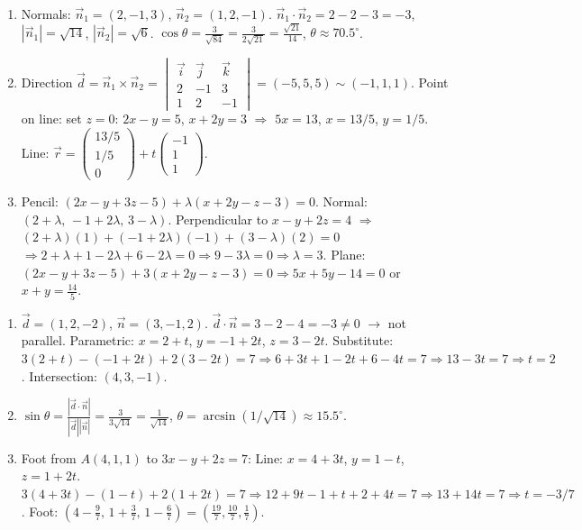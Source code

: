 \documentclass[11pt]{article}
\begin{document}
\begin{corrige}
\begin{enumerate}
\item Normals: $\vec{n}_1=(2,-1,3)$, $\vec{n}_2=(1,2,-1)$.
$\vec{n}_1\cdot\vec{n}_2=2-2-3=-3$, $|\vec{n}_1|=\sqrt{14}$, $|\vec{n}_2|=\sqrt{6}$.
$\cos\theta=\frac{3}{\sqrt{84}}=\frac{3}{2\sqrt{21}}=\frac{\sqrt{21}}{14}$, $\theta\approx 70.5^\circ$.
\item Direction $\vec{d}=\vec{n}_1\times\vec{n}_2=\begin{vmatrix}\vec{i}&\vec{j}&\vec{k}\\2&-1&3\\1&2&-1\end{vmatrix}=(-5,5,5)\sim(-1,1,1)$.
Point on line: set $z=0$: $2x-y=5$, $x+2y=3$ $\Rightarrow$ $5x=13$, $x=13/5$, $y=1/5$.
Line: $\vec{r}=\begin{pmatrix}13/5\\1/5\\0\end{pmatrix}+t\begin{pmatrix}-1\\1\\1\end{pmatrix}$.
\item Pencil: $(2x-y+3z-5)+\lambda(x+2y-z-3)=0$.
Normal: $(2+\lambda,\,-1+2\lambda,\,3-\lambda)$.
Perpendicular to $x-y+2z=4$ $\Rightarrow$ $(2+\lambda)(1)+(-1+2\lambda)(-1)+(3-\lambda)(2)=0$
$\Rightarrow 2+\lambda+1-2\lambda+6-2\lambda=0 \Rightarrow 9-3\lambda=0 \Rightarrow \lambda=3$.
Plane: $(2x-y+3z-5)+3(x+2y-z-3)=0 \Rightarrow 5x+5y-14=0$ or $\boxed{x+y=\frac{14}{5}}$.
\end{enumerate}
\end{corrige}

\begin{corrige}
\begin{enumerate}
\item $\vec{d}=(1,2,-2)$, $\vec{n}=(3,-1,2)$. $\vec{d}\cdot\vec{n}=3-2-4=-3\neq0$ $\rightarrow$ not parallel.
Parametric: $x=2+t$, $y=-1+2t$, $z=3-2t$.
Substitute: $3(2+t)-(-1+2t)+2(3-2t)=7 \Rightarrow 6+3t+1-2t+6-4t=7 \Rightarrow 13-3t=7 \Rightarrow t=2$.
Intersection: $(4,3,-1)$.
\item $\sin\theta=\frac{|\vec{d}\cdot\vec{n}|}{|\vec{d}||\vec{n}|}=\frac{3}{3\sqrt{14}}=\frac{1}{\sqrt{14}}$, $\theta=\arcsin(1/\sqrt{14})\approx 15.5^\circ$.
\item Foot from $A(4,1,1)$ to $3x-y+2z=7$:
Line: $x=4+3t$, $y=1-t$, $z=1+2t$.
$3(4+3t)-(1-t)+2(1+2t)=7 \Rightarrow 12+9t-1+t+2+4t=7 \Rightarrow 13+14t=7 \Rightarrow t=-3/7$.
Foot: $\left(4-\frac{9}{7},\,1+\frac{3}{7},\,1-\frac{6}{7}\right)=\boxed{\left(\frac{19}{7},\frac{10}{7},\frac{1}{7}\right)}$.
\end{enumerate}
\end{corrige}
\end{document}
